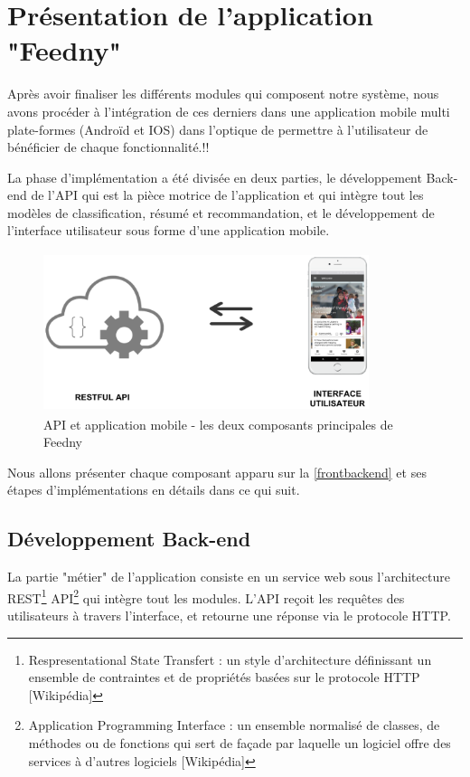 \section{Présentation de l'application "Feedny"}
Après avoir finaliser les différents modules qui composent notre système, nous avons procéder à l'intégration de ces derniers dans une application mobile multi plate-formes (Androïd et IOS) dans l'optique de permettre à l'utilisateur de bénéficier de chaque fonctionnalité.!!

La phase d'implémentation a été divisée en deux parties, le développement Back-end de l'API qui est la pièce motrice de l'application et qui intègre tout les modèles de classification, résumé et recommandation, et le développement de l'interface utilisateur sous forme d'une application mobile.

\begin{figure}[H]
    \centering
    \includegraphics[height=132pt,width=270pt]{img/chapter4/frontbackend.png}
    \caption{API et application mobile - les deux composants principales de \textquotedbl Feedny\textquotedbl }
    \label{frontbackend}
\end{figure}

Nous allons présenter chaque composant apparu sur la \autoref{frontbackend} et ses étapes d'implémentations en détails dans ce qui suit.

    \subsection{Développement Back-end}
    La partie "métier" de l'application consiste en un service web sous l'architecture REST\footnote{Respresentational State Transfert : un style d'architecture définissant un ensemble de contraintes et de propriétés basées sur le protocole HTTP [Wikipédia]} API\footnote{Application Programming Interface : un ensemble normalisé de classes, de méthodes ou de fonctions qui sert de façade par laquelle un logiciel offre des services à d'autres logiciels [Wikipédia]} qui intègre tout les modules. L'API reçoit les requêtes des utilisateurs à travers l'interface, et retourne une réponse via le protocole HTTP.

